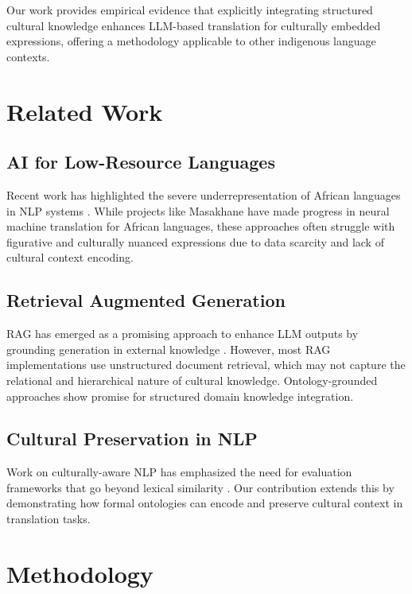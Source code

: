 \documentclass[11pt,twocolumn]{article}
\begin{document}
Our work provides empirical evidence that explicitly integrating structured cultural knowledge enhances LLM-based translation for culturally embedded expressions, offering a methodology applicable to other indigenous language contexts.

\section{Related Work}

\subsection{AI for Low-Resource Languages}

Recent work has highlighted the severe underrepresentation of African languages in NLP systems \cite{nekoto2020participatory}. While projects like Masakhane \cite{orife2020masakhane} have made progress in neural machine translation for African languages, these approaches often struggle with figurative and culturally nuanced expressions due to data scarcity and lack of cultural context encoding.

\subsection{Retrieval Augmented Generation}

RAG has emerged as a promising approach to enhance LLM outputs by grounding generation in external knowledge \cite{lewis2020retrieval}. However, most RAG implementations use unstructured document retrieval, which may not capture the relational and hierarchical nature of cultural knowledge. Ontology-grounded approaches \cite{li2024ontology} show promise for structured domain knowledge integration.

\subsection{Cultural Preservation in NLP}

Work on culturally-aware NLP has emphasized the need for evaluation frameworks that go beyond lexical similarity \cite{hershcovich2022challenges}. Our contribution extends this by demonstrating how formal ontologies can encode and preserve cultural context in translation tasks.

\section{Methodology}
\end{document}
